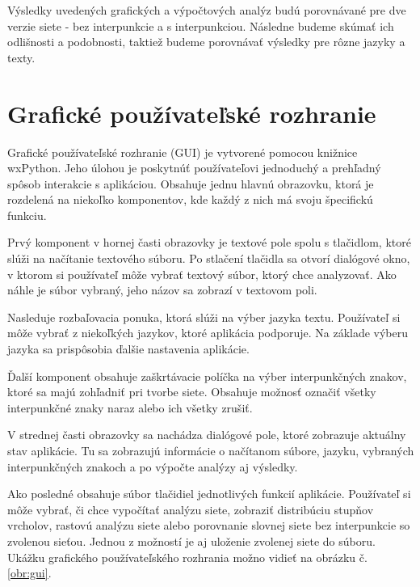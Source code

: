 Výsledky uvedených grafických a výpočtových analýz budú porovnávané pre dve verzie siete - bez interpunkcie a s interpunkciou. Následne
budeme skúmať ich odlišnosti a podobnosti, taktiež budeme porovnávať výsledky pre rôzne jazyky a texty.

\section{Grafické používateľské rozhranie}\label{sec:GUI}

Grafické používateľské rozhranie (GUI) je vytvorené pomocou knižnice wxPython. Jeho úlohou je poskytnúť používateľovi
jednoduchý a prehľadný spôsob interakcie s aplikáciou. Obsahuje jednu hlavnú obrazovku, ktorá je rozdelená na niekoľko komponentov,
kde každý z nich má svoju špecifickú funkciu.

Prvý komponent v hornej časti obrazovky je textové pole spolu s tlačidlom, ktoré slúži na načítanie textového súboru.
Po stlačení tlačidla sa otvorí dialógové okno, v ktorom si používateľ môže vybrať textový súbor, ktorý chce analyzovať.
Ako náhle je súbor vybraný, jeho názov sa zobrazí v textovom poli.

Nasleduje rozbaľovacia ponuka, ktorá slúži na výber jazyka textu. Používateľ si môže vybrať z niekoľkých jazykov,
ktoré aplikácia podporuje. Na základe výberu jazyka sa prispôsobia ďalšie nastavenia aplikácie.

Ďalší komponent obsahuje zaškrtávacie políčka na výber interpunkčných znakov, ktoré sa majú
zohľadniť pri tvorbe siete. Obsahuje možnosť označiť všetky interpunkčné znaky naraz alebo ich všetky zrušiť.

V strednej časti obrazovky sa nachádza dialógové pole, ktoré zobrazuje aktuálny stav aplikácie. Tu sa zobrazujú informácie o načítanom súbore,
jazyku, vybraných interpunkčných znakoch a po výpočte analýzy aj výsledky.

Ako posledné obsahuje súbor tlačidiel jednotlivých funkcií aplikácie. Používateľ si môže vybrať, či chce vypočítať analýzu siete,
zobraziť distribúciu stupňov vrcholov, rastovú analýzu siete alebo porovnanie slovnej siete bez interpunkcie so zvolenou sieťou.
Jednou z možností je aj uloženie zvolenej siete do súboru.
Ukážku grafického používateľského rozhrania možno vidieť na obrázku č. \ref{obr:gui}.

